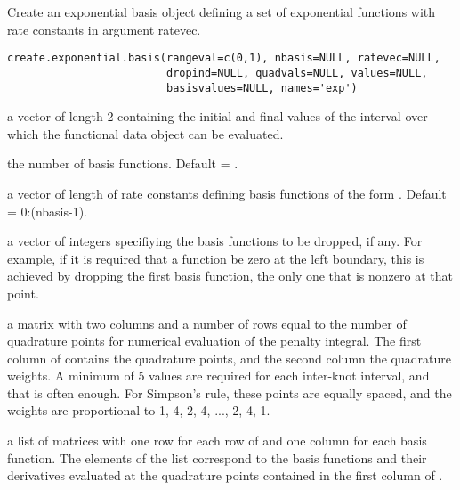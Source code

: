 \begin{Description}\relax
Create an exponential basis object defining a set of exponential
functions with rate constants in argument ratevec.
\end{Description}
\begin{Usage}
\begin{verbatim}
create.exponential.basis(rangeval=c(0,1), nbasis=NULL, ratevec=NULL,
                         dropind=NULL, quadvals=NULL, values=NULL,
                         basisvalues=NULL, names='exp')

\end{verbatim}
\end{Usage}
\begin{Arguments}
\begin{ldescription}
\item[\code{rangeval}] a vector of length 2 containing the initial and final values of the
interval over which the functional data object can be evaluated.

\item[\code{nbasis}] the number of basis functions.  Default = .

\item[\code{ratevec}] a vector of length  of rate constants defining basis
functions of the form .  Default = 0:(nbasis-1).

\item[\code{dropind}] a vector of integers specifiying the basis functions to be dropped,
if any.  For example, if it is required that a function be zero at
the left boundary, this is achieved by dropping the first basis
function, the only one that is nonzero at that point.

\item[\code{quadvals}] a matrix with two columns and a number of rows equal to the number
of quadrature points for numerical evaluation of the penalty
integral.  The first column of  contains the
quadrature points, and the second column the quadrature weights.  A
minimum of 5 values are required for each inter-knot interval, and
that is often enough.  For Simpson's rule, these points are equally
spaced, and the weights are proportional to 1, 4, 2, 4, ..., 2, 4,
1.

\item[\code{values}] a list of matrices with one row for each row of  and
one column for each basis function.  The elements of the list
correspond to the basis functions and their derivatives evaluated at
the quadrature points contained in the first column of
.


\end{ldescription}
\end{Arguments}
